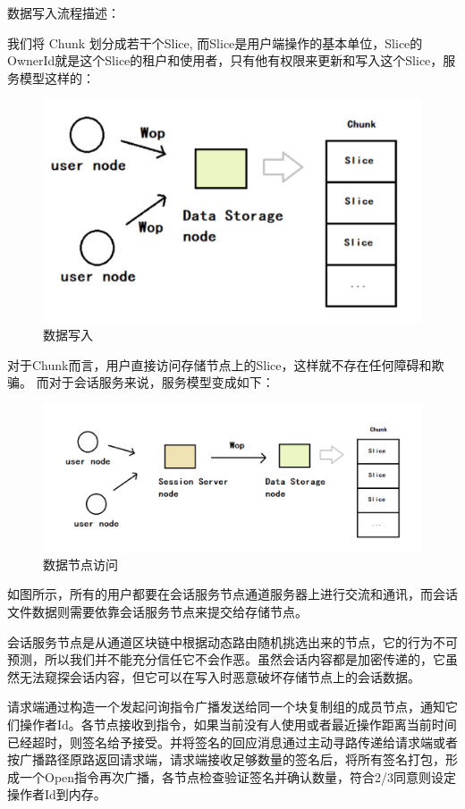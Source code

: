 \documentclass[a4paper,12pt]{article}
\begin{document}
数据写入流程描述：

我们将 Chunk 划分成若干个Slice, 而Slice是用户端操作的基本单位，Slice的OwnerId就是这个Slice的租户和使用者，只有他有权限来更新和写入这个Slice，服务模型这样的：


\begin {figure} [htbp]
\centering \includegraphics [width = 5in] {pic_cn/data_write.png}
\caption {数据写入} \label {fig: d9}
\end {figure}


对于Chunk而言，用户直接访问存储节点上的Slice，这样就不存在任何障碍和欺骗。
而对于会话服务来说，服务模型变成如下：

\begin {figure} [htbp]
\centering \includegraphics [width = 5in] {pic_cn/node_visit.png}
\caption {数据节点访问} \label {fig: d10}
\end {figure}

如图所示，所有的用户都要在会话服务节点通道服务器上进行交流和通讯，而会话文件数据则需要依靠会话服务节点来提交给存储节点。

会话服务节点是从通道区块链中根据动态路由随机挑选出来的节点，它的行为不可预测，所以我们并不能充分信任它不会作恶。虽然会话内容都是加密传递的，它虽然无法窥探会话内容，但它可以在写入时恶意破坏存储节点上的会话数据。

请求端通过构造一个发起问询指令广播发送给同一个块复制组的成员节点，通知它们操作者Id。各节点接收到指令，如果当前没有人使用或者最近操作距离当前时间已经超时，则签名给予接受。并将签名的回应消息通过主动寻路传递给请求端或者按广播路径原路返回请求端，请求端接收足够数量的签名后，将所有签名打包，形成一个Open指令再次广播，各节点检查验证签名并确认数量，符合2/3同意则设定操作者Id到内存。
\end{document}
